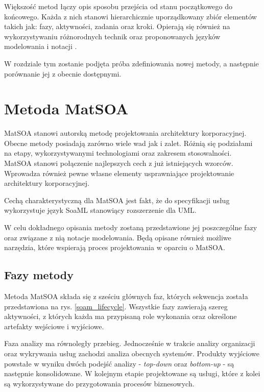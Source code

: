Większość metod łączy opis sposobu przejścia od stanu początkowego do końcowego.  Każda z nich stanowi hierarchicznie uporządkowany zbiór elementów takich jak: fazy, aktywności, zadania oraz kroki. Opierają się również na wykorzystywaniu różnorodnych technik oraz proponowanych języków modelowania i notacji \cite{OffCompSOAM}.

W rozdziale tym zostanie podjęta próba zdefiniowania nowej metody, a następnie porównanie jej z obecnie dostępnymi.


\section{Metoda MatSOA}
MatSOA stanowi autorską metodę projektowania architektury korporacyjnej. Obecne metody posiadają zarówno wiele wad jak i zalet. Różnią się podziałami na etapy, wykorzystywanymi technologiami oraz zakresem stosowalności. MatSOA stanowi połączenie najlepszych cech z już istniejących wzorców. Wprowadza również pewne własne elementy usprawniające projektowanie architektury korporacyjnej. 

Cechą charakterystyczną dla MatSOA jest fakt, że do specyfikacji usług wykorzystuje język SoaML stanowiący rozszerzenie dla UML. 

W celu dokładnego opisania metody zostaną przedstawione jej poszczególne fazy oraz związane z nią notacje modelowania. Będą opisane również możliwe narzędzia, które wspierają proces projektowania w oparciu o MatSOA.

\subsection{Fazy metody}
Metoda MatSOA składa się z sześciu głównych faz, których sekwencja została przedstawiona na rys. \ref{soam_lifecycle}. Wszystkie fazy zawierają szereg aktywności, z których każda ma przypisaną role wykonania oraz określone artefakty wejściowe i wyjściowe.

Faza analizy ma równoległy przebieg. Jednocześnie w trakcie analizy organizacji oraz wykrywania usług zachodzi analiza obecnych systemów. Produkty wyjściowe powstałe w wyniku dwóch podejść analizy - \emph{top-down} oraz \emph{bottom-up} - są następnie konsolidowane. W kolejnym etapie projektowane są usługi, które z kolei są wykorzystywane do przygotowania procesów biznesowych.

